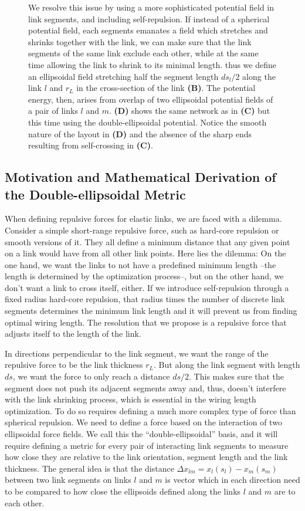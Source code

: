 \documentclass[nofootinbib,preprint,floatfix,titlepage,endfloats,superscriptaddress]{revtex4} %
\begin{document}
\begin{figure}
{    We resolve this issue by using a more sophisticated potential field in link segments, and including self-repulsion. 
    If instead of a spherical potential field, each segments emanates a field which stretches and shrinks together with the link, we can make sure that the link segments of the same link exclude each other, while at the same time allowing the link to shrink to its minimal length.
    thus we define an ellipsoidal field stretching half the segment length $ds_l/2$ along the link $l$ and $r_L$ in the cross-section of the link {\bf(B)}. 
    The potential energy, then, arises from overlap of two ellipsoidal potential fields of a pair of links $l$ and $m$. {\bf(D)} shows the same network as in {\bf(C)} but this time using the double-ellipsoidal potential. 
    Notice the smooth nature of the layout in {\bf(D)} and the absence of the sharp ends resulting from self-crossing in {\bf(C)}.  
    }
    \label{fig:ell}
\end{figure}

\subsection{Motivation and Mathematical Derivation of the Double-ellipsoidal Metric}
When defining repulsive forces for elastic links, we are faced with a dilemma. 
Consider a simple short-range repulsive force, such as hard-core repulsion or smooth versions of it. 
They all define a minimum distance that any given point on a link would have from all other link points. 
Here lies the dilemma: 
On the one hand, we want the links to not have a predefined minimum length --the length is determined by the optimization process--, but on the other hand, we don't want a link to cross itself, either. 
If we introduce self-repulsion through a fixed radius hard-core repulsion, that radius times the number of discrete link segments determines the minimum link length and it will prevent us from finding optimal wiring length. 
The resolution that we propose is a repulsive force that adjusts itself to the length of the link. 

In directions perpendicular to the link segment, we want the range of the repulsive force to be the link thickness $r_L$. But along the link segment with length $ds$, we want the force to only reach a distance $ds/2$. 
This makes sure that the segment does not push its adjacent segments away and, thus, doesn't interfere with the link shrinking process, which is essential in the wiring length optimization.
To do so requires defining a much more complex type of force than spherical repulsion. 
We need to define a force based on the interaction of two ellipsoidal force fields. 
We call this the ``double-ellipsoidal'' basis, and it will require defining a metric for every pair of interacting link segments to measure how close they are relative to the link orientation, segment length and the link thickness. 
The general idea is that the distance $\Delta x_{lm} = x_l(s_l) - x_m(s_m)$ between two link segments on links $l$ and $m$ is vector which in each direction need to be compared to how close the ellipsoids defined along the links $l$ and $m$ are to each other. 
\end{document}
